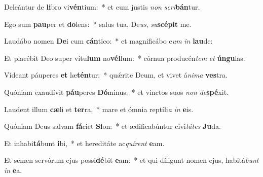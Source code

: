 \item Deleántur de \textbf{li}bro vi\textbf{vén}tium:~* et cum justis \textit{non} \textit{scri}\textbf{bán}tur.
\item Ego sum \textbf{pau}per et \textbf{do}lens:~* salus tua, De\textit{us}, \textit{su}\textbf{scé}\textbf{pit} me.
\item Laudábo nomen \textbf{De}i cum \textbf{cán}tico:~* et magnificábo e\textit{um} \textit{in} \textbf{lau}de:
\item Et placébit Deo super vítu\textbf{lum} no\textbf{vél}lum:~* córnua producén\textit{tem} \textit{et} \textbf{ún}\textbf{gu}las.
\item Vídeant páuperes \textbf{et} læ\textbf{tén}tur:~* quǽrite Deum, et vivet á\textit{ni}\textit{ma} \textbf{ves}tra.
\item Quóniam exaudívit \textbf{páu}peres \textbf{Dó}minus:~* et vinctos suos \textit{non} \textit{de}\textbf{spé}xit.
\item Laudent illum \textbf{cæ}li et \textbf{ter}ra,~* mare et ómnia reptíli\textit{a} \textit{in} \textbf{e}is.
\item Quóniam Deus salvam \textbf{fá}ciet \textbf{Si}on:~* et ædificabúntur civi\textit{tá}\textit{tes} \textbf{Ju}da.
\item Et inhabi\textbf{tá}bunt \textbf{i}bi,~* et hereditáte ac\textit{quí}\textit{rent} \textbf{e}am.
\item Et semen servórum ejus possi\textbf{dé}bit \textbf{e}am:~* et qui díligunt nomen ejus, habitá\textit{bunt} \textit{in} \textbf{e}a.
